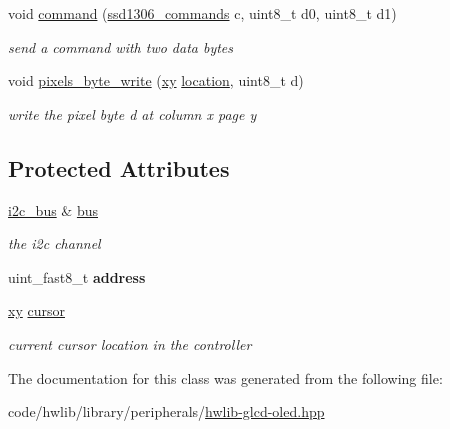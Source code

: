 \begin{DoxyCompactItemize}
\mbox{\label{classhwlib_1_1ssd1306__i2c_adb0629f2319034b7188e65c6156521cd}} 
void \hyperlink{classhwlib_1_1ssd1306__i2c_adb0629f2319034b7188e65c6156521cd}{command} (\hyperlink{namespacehwlib_a9dcd26ad4dc21c1a72b57fb76f65e811}{ssd1306\+\_\+commands} c, uint8\+\_\+t d0, uint8\+\_\+t d1)
\begin{DoxyCompactList}\small\item\em send a command with two data bytes \end{DoxyCompactList}\item 
\mbox{\label{classhwlib_1_1ssd1306__i2c_ae99373da0f0c62aaa4159dfb10bd31e3}} 
void \hyperlink{classhwlib_1_1ssd1306__i2c_ae99373da0f0c62aaa4159dfb10bd31e3}{pixels\+\_\+byte\+\_\+write} (\hyperlink{classhwlib_1_1xy}{xy} \hyperlink{classhwlib_1_1location}{location}, uint8\+\_\+t d)
\begin{DoxyCompactList}\small\item\em write the pixel byte d at column x page y \end{DoxyCompactList}\end{DoxyCompactItemize}
\subsection*{Protected Attributes}
\begin{DoxyCompactItemize}
\item 
\mbox{\label{classhwlib_1_1ssd1306__i2c_a6dd727643c4b270cc364cd6e00ec84e9}} 
\hyperlink{classhwlib_1_1i2c__bus}{i2c\+\_\+bus} \& \hyperlink{classhwlib_1_1ssd1306__i2c_a6dd727643c4b270cc364cd6e00ec84e9}{bus}
\begin{DoxyCompactList}\small\item\em the i2c channel \end{DoxyCompactList}\item 
\mbox{\label{classhwlib_1_1ssd1306__i2c_ad9413c2ad455b2ca2da69cc0e809d7a0}} 
uint\+\_\+fast8\+\_\+t {\bfseries address}
\item 
\mbox{\label{classhwlib_1_1ssd1306__i2c_a77134fdcf0f0f81b9e27bb0bf770133d}} 
\hyperlink{classhwlib_1_1xy}{xy} \hyperlink{classhwlib_1_1ssd1306__i2c_a77134fdcf0f0f81b9e27bb0bf770133d}{cursor}
\begin{DoxyCompactList}\small\item\em current cursor location in the controller \end{DoxyCompactList}\end{DoxyCompactItemize}


The documentation for this class was generated from the following file\+:\begin{DoxyCompactItemize}
\item 
code/hwlib/library/peripherals/\hyperlink{library_2peripherals_2hwlib-glcd-oled_8hpp}{hwlib-\/glcd-\/oled.\+hpp}\end{DoxyCompactItemize}
